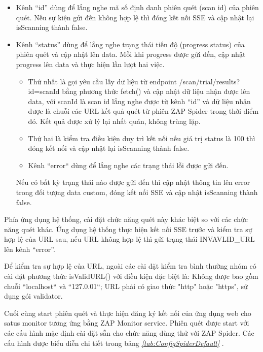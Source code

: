 \begin{itemize}
  \item Kênh “id” dùng để lắng nghe mã số định danh phiên quét (scan id) của phiên quét.
        Nếu sự kiện gửi đến không hợp lệ thì đóng kết nối SSE và cập nhật lại isScanning thành false.
  \item Kênh “status” dùng để lắng nghe trạng thái tiến độ (progress status) của phiên quét và cập nhật lên data.
        Mỗi khi progress được gửi đến, cập nhật progress lên data và thực hiện lần lượt hai việc.
        \begin{itemize}
          \item Thứ nhất là gọi yêu cầu lấy dữ liệu từ endpoint /scan/trial/results?id=scanId bằng phương thức fetch() và cập nhật dữ liệu nhận được lên data, với scanId là scan id lắng nghe được từ kênh “id” và dữ liệu nhận được là chuỗi các URL kết quả quét từ phiên ZAP Spider trong thời điểm đó.
                Kết quả được xử lý lại nhất quán, không trùng lặp.
          \item Thứ hai là kiểm tra điều kiện duy trì kết nối nếu giá trị status là 100 thì đóng kết nối và cập nhật lại isScanning thành false.
          \item Kênh “error“ dùng để lắng nghe các trạng thái lỗi được gửi đến.
        \end{itemize}
        Nếu có bất kỳ trạng thái nào được gửi đến thì cập nhật thông tin lên error trong đối tượng data custom, đóng kết nối SSE và cập nhật isScanning thành false.
\end{itemize}

Phía ứng dụng hệ thống, cài đặt chức năng quét này khác biệt so với các chức năng quét khác.
Ứng dụng hệ thống thực hiện kết nối SSE trước và kiểm tra sự hợp lệ của URL sau, nếu URL không hợp lệ thì gửi trạng thái INVAVLID\_URL lên kênh “error”.

Để kiểm tra sự hợp lệ của URL, ngoài các cài đặt kiểm tra bình thường nhóm có cài đặt phương thức isValidURL() với điều kiện đặc biệt là: Không được bao gồm chuỗi “localhost“ và “127.0.01“; URL phải có giao thức "http" hoặc "https", sử dụng gói validator.

Cuối cùng start phiên quét và thực hiện đăng ký kết nối của ứng dụng web cho satus monitor tương ứng bằng ZAP Monitor service.
Phiên quét được start với các cấu hình mặc định cài đặt sẵn cho chức năng dùng thử với ZAP Spider.
Các cấu hình được biểu diễn chi tiết trong bảng \textit{\ref{tab:ConfigSpiderDefault} }.

